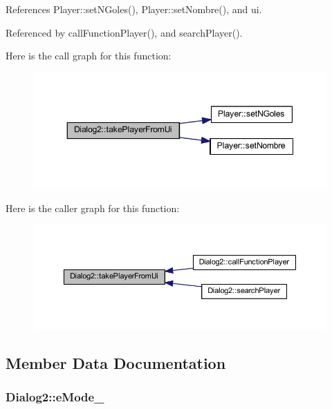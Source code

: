 References Player\+::set\+N\+Goles(), Player\+::set\+Nombre(), and ui.



Referenced by call\+Function\+Player(), and search\+Player().



Here is the call graph for this function\+:\nopagebreak
\begin{figure}[H]
\begin{center}
\leavevmode
\includegraphics[width=348pt]{d8/dad/class_dialog2_a7d1f42eb6a8798be34da38e4df4929f7_cgraph}
\end{center}
\end{figure}




Here is the caller graph for this function\+:\nopagebreak
\begin{figure}[H]
\begin{center}
\leavevmode
\includegraphics[width=350pt]{d8/dad/class_dialog2_a7d1f42eb6a8798be34da38e4df4929f7_icgraph}
\end{center}
\end{figure}




\subsection{Member Data Documentation}
\hypertarget{class_dialog2_a30d760908a70fc65c73499b96c177d46}{}
\subsubsection[{e\+Mode\+\_\+}]{ Dialog2\+::e\+Mode\+\_\+\hspace{0.3cm}{\ttfamily [private]}}\label{class_dialog2_a30d760908a70fc65c73499b96c177d46}


